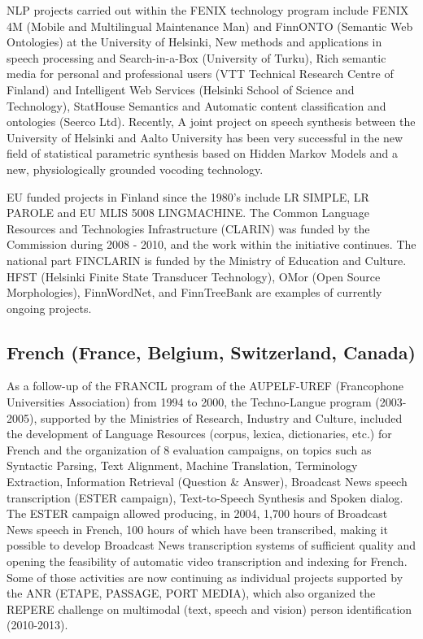 \documentclass[10pt, plain]{../../metanetpaper}
\begin{document}
\begin{multicols}{2}
\begin{small}
NLP projects carried out within the FENIX technology program include FENIX 4M (Mobile and Multilingual Maintenance Man) and FinnONTO (Semantic Web Ontologies) at the University of Helsinki, New methods and applications in speech processing and Search-in-a-Box (University of Turku), Rich semantic media for personal and professional users (VTT Technical Research Centre of Finland) and Intelligent Web Services (Helsinki School of Science and Technology), StatHouse Semantics and Automatic content classification and ontologies (Seerco Ltd).  Recently, A joint project on speech synthesis between the University of Helsinki and Aalto University has been very successful in the new field of statistical parametric synthesis based on Hidden Markov Models and a new, physiologically grounded vocoding technology.

EU funded projects in Finland since the 1980’s include LR SIMPLE, LR PAROLE and EU MLIS 5008 LINGMACHINE. The Common Language Resources and Technologies Infrastructure (CLARIN) was funded by the Commission during 2008 - 2010, and the work within the initiative continues. The national part FINCLARIN is funded by the Ministry of Education and Culture.  HFST (Helsinki Finite State Transducer Technology), OMor (Open Source Morphologies), FinnWordNet, and FinnTreeBank are examples of currently ongoing projects.

\subsection*{French (France, Belgium, Switzerland, Canada)}
\label{sec:french-france-belg}

As a follow-up of the FRANCIL program of the AUPELF-UREF (Francophone Universities Association) from 1994 to 2000, the Techno-Langue program (2003-2005), supported by the Ministries of Research, Industry and Culture, included the development of Language Resources (corpus, lexica, dictionaries, etc.) for French and the organization of 8 evaluation campaigns, on topics such as Syntactic Parsing, Text Alignment, Machine Translation, Terminology Extraction, Information Retrieval (Question \& Answer), Broadcast News speech transcription (ESTER campaign), Text-to-Speech Synthesis and Spoken dialog. The ESTER campaign allowed producing, in 2004, 1,700 hours of Broadcast News speech in French, 100 hours of which have been transcribed, making it possible to develop Broadcast News transcription systems of sufficient quality and opening the feasibility of automatic video transcription and indexing for French.  Some of those activities are now continuing as individual projects supported by the ANR (ETAPE, PASSAGE, PORT MEDIA), which also organized the REPERE challenge on multimodal (text, speech and vision) person identification (2010-2013).


\end{small}
\end{multicols}
\end{document}
